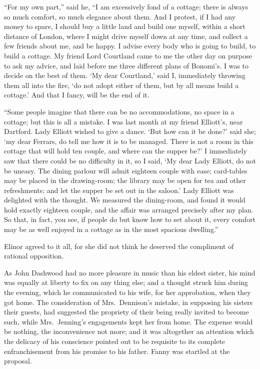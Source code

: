 \documentclass{article}
\begin{document}
``For my own part,'' said he, ``I am excessively fond
of a cottage; there is always so much comfort, so much
elegance about them.  And I protest, if I had any money
to spare, I should buy a little land and build one myself,
within a short distance of London, where I might drive
myself down at any time, and collect a few friends
about me, and be happy.  I advise every body who is going
to build, to build a cottage.  My friend Lord Courtland
came to me the other day on purpose to ask my advice,
and laid before me three different plans of Bonomi's.
I was to decide on the best of them.  `My dear Courtland,'
said I, immediately throwing them all into the fire, `do not
adopt either of them, but by all means build a cottage.'
And that I fancy, will be the end of it.

``Some people imagine that there can be no accommodations,
no space in a cottage; but this is all a mistake.
I was last month at my friend Elliott's, near Dartford.
Lady Elliott wished to give a dance.  `But how can it
be done?' said she; `my dear Ferrars, do tell me how it
is to be managed.  There is not a room in this cottage
that will hold ten couple, and where can the supper be?'
I immediately saw that there could be no difficulty in it,
so I said, `My dear Lady Elliott, do not be uneasy.
The dining parlour will admit eighteen couple with ease;
card-tables may be placed in the drawing-room; the library
may be open for tea and other refreshments; and let the
supper be set out in the saloon.'  Lady Elliott was delighted
with the thought.  We measured the dining-room, and found
it would hold exactly eighteen couple, and the affair
was arranged precisely after my plan.  So that, in fact,
you see, if people do but know how to set about it,
every comfort may be as well enjoyed in a cottage
as in the most spacious dwelling.''

Elinor agreed to it all, for she did not think
he deserved the compliment of rational opposition.

As John Dashwood had no more pleasure in music than his
eldest sister, his mind was equally at liberty to fix on
any thing else; and a thought struck him during the evening,
which he communicated to his wife, for her approbation,
when they got home.  The consideration of Mrs.\ Dennison's
mistake,
in supposing his sisters their guests, had suggested the
propriety of their being really invited to become such,
while Mrs.\ Jenning's engagements kept her from home.
The expense would be nothing, the inconvenience not more;
and it was altogether an attention which the delicacy
of his conscience pointed out to be requisite to its
complete enfranchisement from his promise to his father.
Fanny was startled at the proposal.
\end{document}
